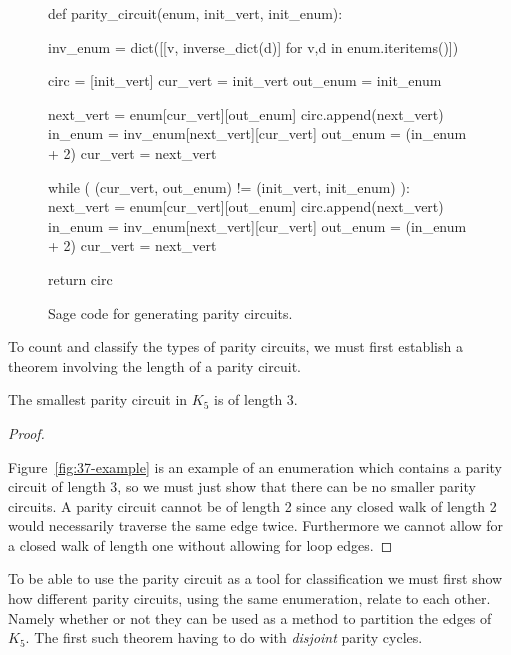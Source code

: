 \begin{figure}[h!] 
\begin{sageblock}
def parity_circuit(enum, init_vert, init_enum):

    inv_enum = dict([[v, inverse_dict(d)] for v,d in enum.iteritems()])
    
    
    circ = [init_vert]
    cur_vert = init_vert
    out_enum = init_enum

    next_vert = enum[cur_vert][out_enum]
    circ.append(next_vert)
    in_enum = inv_enum[next_vert][cur_vert]
    out_enum = (in_enum + 2)%
    cur_vert = next_vert

    
    while ( (cur_vert, out_enum) != (init_vert, init_enum) ):
        next_vert = enum[cur_vert][out_enum]
        circ.append(next_vert)
        in_enum = inv_enum[next_vert][cur_vert]
        out_enum = (in_enum + 2)%
        cur_vert = next_vert
        
    return circ
\end{sageblock}
\caption{Sage code for generating parity circuits.\label{fig:sage_pcircuit}}
\end{figure}

To count and classify the types of parity circuits, we must first establish a theorem involving the length of a parity circuit.

\begin{lemma}
  \label{lem:smallest_pcircuit}
The smallest parity circuit in $K_5$ is of length $3$. 
\end{lemma}
\begin{proof}
  \label{pf:smallest_pcircuit}

Figure~\ref{fig:37-example} is an example of an enumeration which contains a parity circuit of length 3, so we must just show that there can be no smaller parity circuits. A parity circuit cannot be of length 2 since any closed walk of length 2 would necessarily traverse the same edge twice. Furthermore we cannot allow for a closed walk of length one without allowing for loop edges. 
\end{proof}

\noindent
To be able to use the parity circuit as a tool for classification we must first show how different parity circuits, using the same enumeration, relate to each other. Namely whether or not they can be used as a method to partition the edges of $K_5$. The first such theorem having to do with {\em disjoint } parity cycles. 

